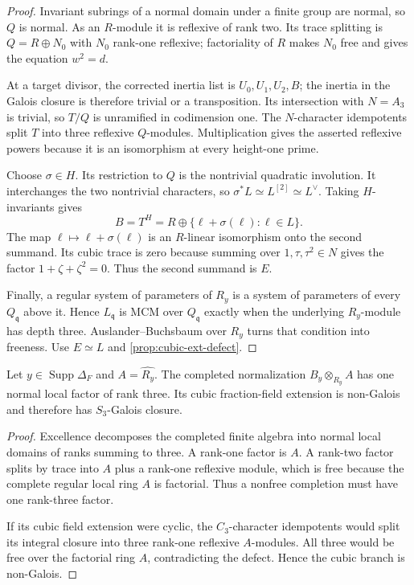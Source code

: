 \begin{proof}
Invariant subrings of a normal domain under a finite group are normal, so
\(Q\) is normal.  As an \(R\)-module it is reflexive of rank two.  Its trace
splitting is \(Q=R\oplus N_0\) with \(N_0\) rank-one reflexive; factoriality
of \(R\) makes \(N_0\) free and gives the equation \(w^2=d\).

At a target divisor, the corrected inertia list is
\(U_0,U_1,U_2,B\); the inertia in the Galois closure is therefore trivial or
a transposition.  Its intersection with \(N=A_3\) is trivial, so \(T/Q\) is
unramified in codimension one.  The \(N\)-character idempotents split \(T\)
into three reflexive \(Q\)-modules.  Multiplication gives the asserted
reflexive powers because it is an isomorphism at every height-one prime.

Choose \(\sigma\in H\).  Its restriction to \(Q\) is the nontrivial
quadratic involution.  It interchanges the two nontrivial characters, so
\(\sigma^*L\simeq L^{[2]}\simeq L^\vee\).  Taking \(H\)-invariants gives
\[
B=T^H=R\oplus\{\ell+\sigma(\ell):\ell\in L\}.
\]
The map \(\ell\mapsto\ell+\sigma(\ell)\) is an \(R\)-linear isomorphism onto
the second summand.  Its cubic trace is zero because summing over
\(1,\tau,\tau^2\in N\) gives the factor \(1+\zeta+\zeta^2=0\).  Thus the
second summand is \(E\).

Finally, a regular system of parameters of \(R_y\) is a system of parameters
of every \(Q_\mathfrak q\) above it.  Hence \(L_\mathfrak q\) is MCM over
\(Q_\mathfrak q\) exactly when the underlying \(R_y\)-module has depth three.
Auslander--Buchsbaum over \(R_y\) turns that condition into freeness.  Use
\(E\simeq L\) and \cref{prop:cubic-ext-defect}.
\end{proof}

\begin{corollary}
\label{cor:formal-cubic-defect}
Let \(y\in\operatorname{Supp}\Delta_F\) and
\(A=\widehat{R_y}\).  The completed normalization
\(B_y\otimes_{R_y}A\) has one normal local factor of rank three.  Its cubic
fraction-field extension is non-Galois and therefore has \(S_3\)-Galois
closure.
\end{corollary}

\begin{proof}
Excellence decomposes the completed finite algebra into normal local domains
of ranks summing to three.  A rank-one factor is \(A\).  A rank-two factor
splits by trace into \(A\) plus a rank-one reflexive module, which is free
because the complete regular local ring \(A\) is factorial.  Thus a nonfree
completion must have one rank-three factor.

If its cubic field extension were cyclic, the \(C_3\)-character idempotents
would split its integral closure into three rank-one reflexive \(A\)-modules.
All three would be free over the factorial ring \(A\), contradicting the
defect.  Hence the cubic branch is non-Galois.
\end{proof}

